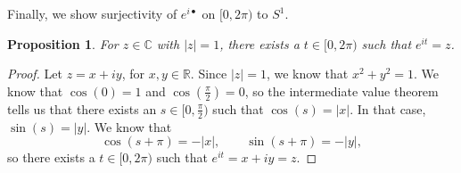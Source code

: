 \documentclass[a4paper, openany]{memoir}
\theoremstyle{definition}
\theoremstyle{plain}
\newtheorem{proposition}[definition]{Proposition}
\begin{document}
\noindent Finally, we show surjectivity of $e^{i \bullet}$ on $[0, 2\pi)$ to $S^1$.
\begin{proposition}
For $z \in \mathbb{C}$ with $|z| = 1$, there exists a $t \in [0, 2\pi)$ such that $e^{it} = z$.
\end{proposition}
\begin{proof}
Let $z = x + iy$, for $x, y \in \mathbb{R}$. Since $|z| = 1$, we know that $x^2 + y^2 = 1$. We know that $\cos(0) = 1$ and $\cos(\frac{\pi}{2}) = 0$, so the intermediate value theorem tells us that there exists an $s \in [0, \frac{\pi}{2})$ such that $\cos (s) = |x|$. In that case, $\sin (s) = |y|$. We know that
\[\cos (s + \pi) = -|x|, \qquad \sin (s + \pi) = -|y|,\]
so there exists a $t \in [0, 2\pi)$ such that $e^{it} = x + iy = z$.
\end{proof}
\end{document}
